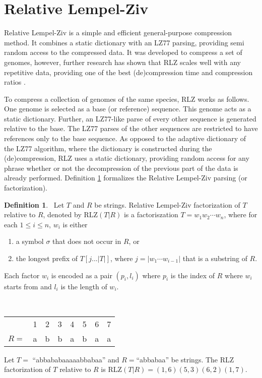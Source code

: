 \documentclass[english,twoside,censored,csm,algorithms-track-2020]{HYthesisML}
\theoremstyle{plain}
\theoremstyle{definition}
\newtheorem{definition}[theorem]{Definition}
\begin{document}
\section{Relative Lempel-Ziv}
Relative Lempel-Ziv is a simple and efficient \citep{Deorowicz11} general-purpose \citep{Hoobin11}
compression method. It combines a static dictionary with an LZ77 parsing, providing semi random
access to the compressed data. It was developed to compress a set of genomes, however, further
research has shown that RLZ scales well with any repetitive data, providing
one of the best (de)compression time and compression ratios \citep{Gagie16}.

To compress a collection of genomes of the same species, RLZ works as follows. One genome is selected
as a base (or reference) sequence. This genome acts as a static dictionary. Further, an LZ77-like parse of every other sequence
is generated relative to the base. The LZ77 parses of the other sequences are restricted to have
references only to the base sequence. As opposed to the adaptive dictionary
of the LZ77 algorithm, where the dictionary is constructed during the (de)compression, RLZ uses
a static dictionary, providing random access for any phrase whether or not the decompression
of the previous part of the data is already performed. Definition \ref{def-rlz} formalizes the
Relative Lempel-Ziv parsing (or factorization).

\begin{definition}~\label{def-rlz}
  Let $T$ and $R$ be strings. Relative Lempel-Ziv factorization of $T$ relative to $R$, denoted by
  RLZ$(T|R)$ is a factoriszation $T=w_1w_2\cdots w_n$, where for each $1\leq i \leq n$, $w_i$ is either
  \begin{enumerate}[leftmargin=28pt]
  \item a symbol $\sigma$ that does not occur in $R$, or
  \item the longest prefix of $T[j...|T|]$, where $j = |w_1\cdots w_{i-1}|$ that is a substring of $R$.
  \end{enumerate}
  Each factor $w_i$ is encoded as a pair $(p_i,l_i)$ where $p_i$ is the index of $R$ where $w_i$
  starts from and $l_i$ is the length of $w_i$.
\end{definition}

\begin{testexample}
  ~\\
  \vspace{-1cm}
  \begin{center}
  \begin{tabular}[H]{r c c c c c c c}
    &1&2&3&4&5&6&7 \\
    $R=$&a&b&b&a&b&a&a \\
  \end{tabular}
  \end{center}
  Let $T=$ ``abbababaaaaabbabaa'' and $R=$``abbabaa'' be strings. The RLZ factorization of $T$
  relative to $R$ is RLZ$(T|R)=(1,6)(5,3)(6,2)(1,7)$.
\end{testexample}
\end{document}
